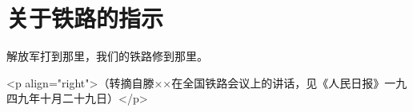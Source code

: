 \section[关于铁路的指示（一九四九年十月）]{关于铁路的指示}


解放军打到那里，我们的铁路修到那里。

<p align="right">（转摘自滕××在全国铁路会议上的讲话，见《人民日报》一九四九年十月二十九日）</p>



